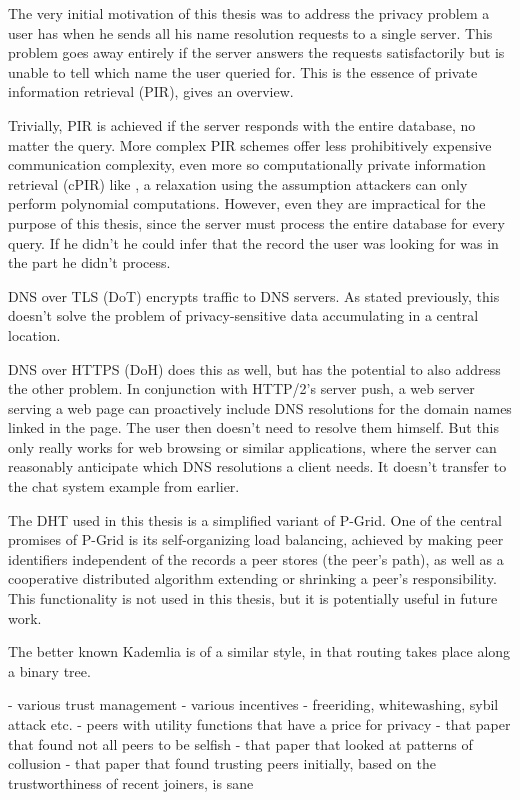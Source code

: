 The very initial motivation of this thesis was to address the privacy problem a
user has when he sends all his name resolution requests to a single server. This
problem goes away entirely if the server answers the requests satisfactorily but
is unable to tell which name the user queried for. This is the essence of
private information retrieval (PIR), \cite{gasarch2004survey} gives an overview.

Trivially, PIR is achieved if the server responds with the entire database, no
matter the query. More complex PIR schemes offer less prohibitively expensive
communication complexity, even more so computationally private information
retrieval (cPIR) like \cite{cachin1999computationally}, a relaxation using the
assumption attackers can only perform polynomial computations. However, even
they are impractical for the purpose of this thesis, since the server must
process the entire database for every query. If he didn't he could infer that
the record the user was looking for was in the part he didn't process.

DNS over TLS (DoT)\cite{RFC7858} encrypts traffic to DNS servers. As stated
previously, this doesn't solve the problem of privacy-sensitive data
accumulating in a central location.

DNS over HTTPS (DoH)\cite{RFC8484} does this as well, but has the potential to
also address the other problem. In conjunction with HTTP/2's server
push\cite{RFC7540}, a web server serving a web page can proactively include DNS
resolutions for the domain names linked in the page. The user then doesn't need
to resolve them himself. But this only really works for web browsing or similar
applications, where the server can reasonably anticipate which DNS resolutions a
client needs. It doesn't transfer to the chat system example from earlier.

The \ac{DHT} used in this thesis is a simplified variant of
P-Grid\cite{aberer2001pgrid}. One of the central promises of P-Grid is its
self-organizing load balancing, achieved by making peer identifiers independent
of the records a peer stores (the peer's path), as well as a cooperative
distributed algorithm extending or shrinking a peer's responsibility. This
functionality is not used in this thesis, but it is potentially useful in future
work.

The better known Kademlia\cite{maymounkov2002kademlia} is of a similar style, in
that routing takes place along a binary tree.

- various trust management
- various incentives
- freeriding, whitewashing, sybil attack etc.
- peers with utility functions that have a price for privacy
- that paper that found not all peers to be selfish
- that paper that looked at patterns of collusion
- that paper that found trusting peers initially, based on the trustworthiness
  of recent joiners, is sane

